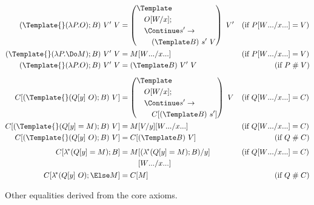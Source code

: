 \begin{figure}[t]
\centering
\small
\begin{align*}
  (\Template{} (\lambda P. O); B) ~ V' ~ V
  &=
  \left(
    \begin{aligned}
      &\Template \\
      &\quad O\subst{x}{W}; \\
      &\quad \Continue s' \to \\
      &\qquad (\Template B)~s'~V
    \end{aligned}
  \right)
  ~ V'
  &(\text{if } P\subst{\many{x}}{\many{W}} &= V)
  \\
  (\Template{} (\lambda P. \Do M); B) ~ V' ~ V
  &=
  M\subst{\many{x}}{\many{W}}
  &(\text{if } P\subst{\many{x}}{\many{W}} &= V)
  \\
  (\Template{} (\lambda P. O); B) ~ V' ~ V
  &=
  (\Template B) ~ V' ~ V
  &(\text{if } P &\apart V)
  \\[1ex]
  C[(\Template{} (Q[y] ~ O); B) ~ V]
  &=
  \left(
    \begin{aligned}
      &\Template \\
      &\quad O\subst{x}{W}; \\
      &\quad \Continue s' \to \\
      &\qquad C[(\Template B)~s']
    \end{aligned}
  \right)
  ~ V
  &(\text{if } Q\subst{\many{x}}{\many{W}} &= C)
  \\
  C[(\Template{} (Q[y] = M); B) ~ V]
  &=
  M\subst{y}{V}\subst{\many{x}}{\many{W}}
  &(\text{if } Q\subst{\many{x}}{\many{W}} &= C)
  \\
  C[(\Template{} (Q[y] ~ O); B) ~ V]
  &=
  C[(\Template B) ~ V]
  &(\text{if } Q &\apart C)
  \\[1ex]
  C[\lamstar (Q[y] = M); B]
  &=
  \begin{aligned}[t]
    M
    &\subst{y}{(\lamstar (Q[y] = M); B)}
    \\
    &\subst{\many{x}}{\many{W}}
  \end{aligned}
  &(\text{if } Q\subst{\many{x}}{\many{W}} &= C)
  \\
  C[\lamstar (Q[y] ~ O); \Else M]
  &=
  C[M]
  &(\text{if } Q &\apart C)
\end{align*}
\caption{Other equalities derived from the core axioms.}
\label{fig:derived-equalities}
\end{figure}

